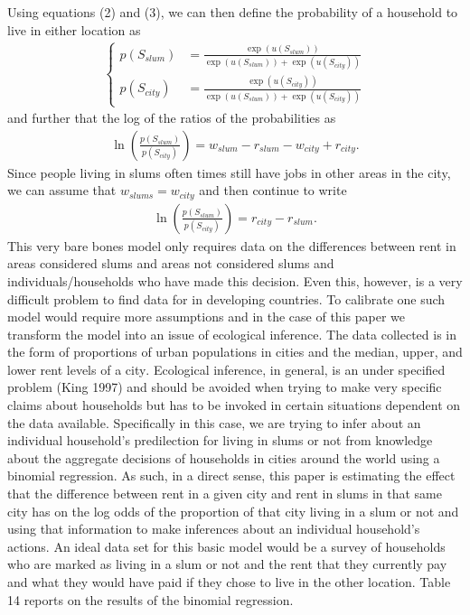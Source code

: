     Using equations (2) and (3), we can then define the probability of a household to live in either location as \begin{align}\begin{cases}
    p(S_{slum}) &= \frac{\exp{(u(S_{slum}))}}{\exp{(u(S_{slum}))} + \exp{(u(S_{city}))}}\\
    p(S_{city}) &= \frac{\exp{(u(S_{city}))}}{\exp{(u(S_{slum}))} + \exp{(u(S_{city}))}}
    \end{cases}\end{align} and further that the log of the ratios of the probabilities as \begin{align}\ln\left(\frac{p(S_{slum})}{p(S_{city})}\right) = w_{slum} - r_{slum} - w_{city} + r_{city}.\end{align} Since people living in slums often times still have jobs in other areas in the city, we can assume that $w_{slums} = w_{city}$ and then continue to write \begin{align}
        \ln\left(\frac{p(S_{slum})}{p(S_{city})}\right) = r_{city} - r_{slum}.
    \end{align}
    This very bare bones model only requires data on the differences between rent in areas considered slums and areas not considered slums and individuals/households who have made this decision. Even this, however, is a very difficult problem to find data for in developing countries. To calibrate one such model would require more assumptions and in the case of this paper we transform the model into an issue of ecological inference. The data collected is in the form of proportions of urban populations in cities\textsuperscript{\cite{WBslums}} and the median, upper, and lower rent levels of a city\textsuperscript{\cite{Numbeo}}. Ecological inference, in general, is an under specified problem (King 1997)\textsuperscript{\cite{GaryKing}} and should be avoided when trying to make very specific claims about households but has to be invoked in certain situations dependent on the data available. Specifically in this case, we are trying to infer about an individual household's predilection for living in slums or not from knowledge about the aggregate decisions of households in cities around the world using a binomial regression. As such, in a direct sense, this paper is estimating the effect that the difference between rent in a given city and rent in slums in that same city has on the log odds of the proportion of that city living in a slum or not and using that information to make inferences about an individual household's actions. An ideal data set for this basic model would be a survey of households who are marked as living in a slum or not and the rent that they currently pay and what they would have paid if they chose to live in the other location. Table 14 reports on the results of the binomial regression.

